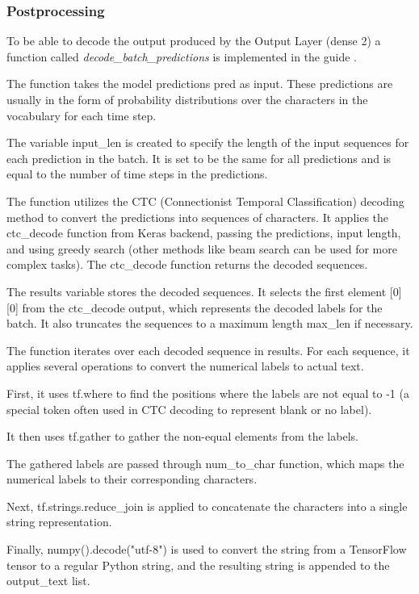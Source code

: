 \subsubsection{Postprocessing}
To be able to decode the output produced by the Output Layer (dense 2) a function called  \textit{decode\_batch\_predictions} is implemented in the guide \textit{\cite{HTR}}.

The function takes the model predictions pred as input. These predictions are usually in the form of probability distributions over the characters in the vocabulary for each time step.

The variable input\_len is created to specify the length of the input sequences for each prediction in the batch. It is set to be the same for all predictions and is equal to the number of time steps in the predictions.

The function utilizes the CTC (Connectionist Temporal Classification) decoding method to convert the predictions into sequences of characters. It applies the ctc\_decode function from Keras backend, passing the predictions, input length, and using greedy search (other methods like beam search can be used for more complex tasks). The ctc\_decode function returns the decoded sequences.

The results variable stores the decoded sequences. It selects the first element [0][0] from the ctc\_decode output, which represents the decoded labels for the batch. It also truncates the sequences to a maximum length max\_len if necessary.

The function iterates over each decoded sequence in results. For each sequence, it applies several operations to convert the numerical labels to actual text.

First, it uses tf.where to find the positions where the labels are not equal to -1 (a special token often used in CTC decoding to represent blank or no label).

It then uses tf.gather to gather the non-equal elements from the labels.

The gathered labels are passed through num\_to\_char function, which maps the numerical labels to their corresponding characters.

Next, tf.strings.reduce\_join is applied to concatenate the characters into a single string representation.

Finally, numpy().decode("utf-8") is used to convert the string from a TensorFlow tensor to a regular Python string, and the resulting string is appended to the output\_text list.

